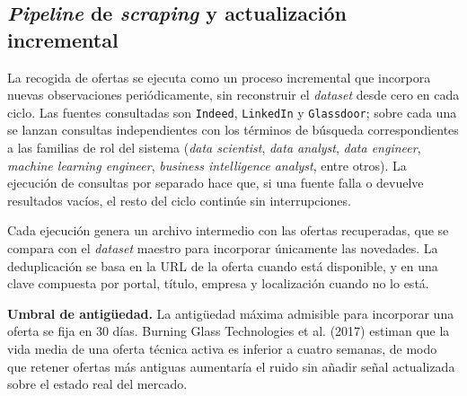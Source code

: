 \subsection{\textit{Pipeline} de \textit{scraping} y actualización incremental}
\label{subsec:pipeline_scraping}
La recogida de ofertas se ejecuta como un proceso incremental que incorpora nuevas observaciones periódicamente, sin reconstruir el \textit{dataset} desde cero en cada ciclo. Las fuentes consultadas son \texttt{Indeed}, \texttt{LinkedIn} y \texttt{Glassdoor}; sobre cada una se lanzan consultas independientes con los términos de búsqueda correspondientes a las familias de rol del sistema (\textit{data scientist}, \textit{data analyst}, \textit{data engineer}, \textit{machine learning engineer}, \textit{business intelligence analyst}, entre otros). La ejecución de consultas por separado hace que, si una fuente falla o devuelve resultados vacíos, el resto del ciclo continúe sin interrupciones.

Cada ejecución genera un archivo intermedio con las ofertas recuperadas, que se compara con el \textit{dataset} maestro para incorporar únicamente las novedades. La deduplicación se basa en la URL de la oferta cuando está disponible, y en una clave compuesta por portal, título, empresa y localización cuando no lo está.

\textbf{Umbral de antigüedad.} La antigüedad máxima admisible para incorporar una oferta se fija en 30 días. Burning Glass Technologies et al. (2017) estiman que la vida media de una oferta técnica activa es inferior a cuatro semanas, de modo que retener ofertas más antiguas aumentaría el ruido sin añadir señal actualizada sobre el estado real del mercado.


